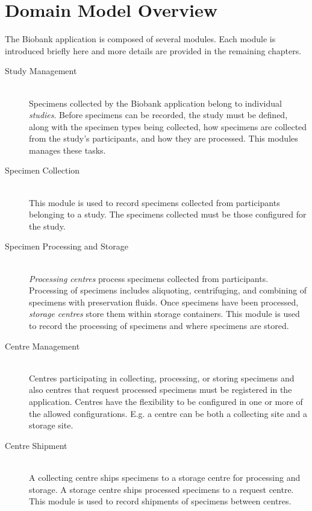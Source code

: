\chapter{Domain Model Overview}

The Biobank application is composed of several modules. Each module is
introduced briefly here and more details are provided in the remaining
chapters.

\begin{description}

\item[Study Management] \hfill \\ Specimens collected by the Biobank
  application belong to individual \emph{studies}. Before specimens can be
  recorded, the study must be defined, along with the specimen types being
  collected, how specimens are collected from the study's participants, and how
  they are processed. This modules manages these tasks.

\item[Specimen Collection] \hfill \\ This module is used to record
  specimens collected from participants belonging to a study. The specimens
  collected must be those configured for the study.

\item[Specimen Processing and Storage] \hfill \\ \emph{Processing centres}
  process specimens collected from participants. Processing of specimens
  includes aliquoting, centrifuging, and combining of specimens with
  preservation fluids.  Once specimens have been processed, \emph{storage
    centres} store them within storage containers. This module is used to
  record the processing of specimens and where specimens are stored.

\item[Centre Management] \hfill \\ Centres participating in collecting,
  processing, or storing specimens and also centres that request processed
  specimens must be registered in the application. Centres have the
  flexibility to be configured in one or more of the allowed
  configurations. E.g. a centre can be both a collecting site and a storage
  site.

\item[Centre Shipment] \hfill \\ A collecting centre ships specimens to a
  storage centre for processing and storage. A storage centre ships processed
  specimens to a request centre. This module is used to record shipments of
  specimens between centres.


\end{description}
